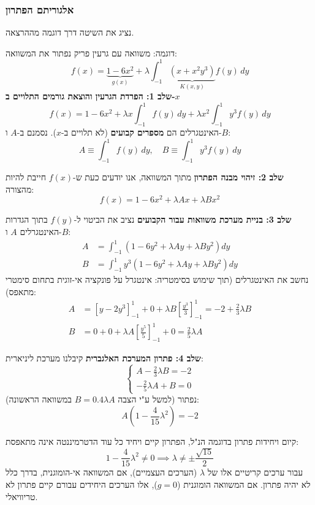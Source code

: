 \subsubsection*{אלגוריתם הפתרון}
נציג את השיטה דרך דוגמה מההרצאה.
\begin{examplebox}{דוגמה: משוואה עם גרעין פריק}
נפתור את המשוואה:
\[
f(x) = \underbrace{1 - 6x^2}_{g(x)} + \lambda \int_{-1}^{1} \underbrace{(x + x^2 y^3)}_{K(x,y)} f(y) \, dy
\]
\textbf{שלב 1: הפרדת הגרעין והוצאת גורמים התלויים ב-$x$}
\[
f(x) = 1 - 6x^2 + \lambda x \int_{-1}^{1} f(y) \, dy + \lambda x^2 \int_{-1}^{1} y^3 f(y) \, dy
\]
האינטגרלים הם \textbf{מספרים קבועים} (לא תלויים ב-$x$). נסמנם ב-$A$ ו-$B$:
\[
A \equiv \int_{-1}^{1} f(y) \, dy, \quad B \equiv \int_{-1}^{1} y^3 f(y) \, dy
\]

\textbf{שלב 2: זיהוי מבנה הפתרון}
מתוך המשוואה, אנו יודעים כעת ש-$f(x)$ חייבת להיות מהצורה:
\[
\boxed{f(x) = 1 - 6x^2 + \lambda A x + \lambda B x^2}
\]

\textbf{שלב 3: בניית מערכת משוואות עבור הקבועים}
נציב את הביטוי ל-$f(y)$ בתוך הגדרות האינטגרלים $A$ ו-$B$:
\begin{align*}
A &= \int_{-1}^{1} \left( 1 - 6y^2 + \lambda A y + \lambda B y^2 \right) dy \\
B &= \int_{-1}^{1} y^3 \left( 1 - 6y^2 + \lambda A y + \lambda B y^2 \right) dy
\end{align*}
נחשב את האינטגרלים (תוך שימוש בסימטריה: אינטגרל על פונקציה אי-זוגית בתחום סימטרי מתאפס):
\begin{align*}
A &= [y - 2y^3]_{-1}^{1} + 0 + \lambda B [\frac{y^3}{3}]_{-1}^{1} = -2 + \frac{2}{3}\lambda B \\
B &= 0 + 0 + \lambda A [\frac{y^5}{5}]_{-1}^{1} + 0 = \frac{2}{5}\lambda A
\end{align*}

\textbf{שלב 4: פתרון המערכת האלגברית}
קיבלנו מערכת ליניארית:
\[
\begin{cases}
A - \frac{2}{3}\lambda B = -2 \\
-\frac{2}{5}\lambda A + B = 0
\end{cases}
\]
נפתור (למשל ע"י הצבה $B = 0.4\lambda A$ במשוואה הראשונה):
\[
A\left(1 - \frac{4}{15}\lambda^2\right) = -2
\]
\end{examplebox}

\begin{theorembox}{קיום ויחידות פתרון}
בדוגמה הנ"ל, הפתרון קיים ויחיד כל עוד הדטרמיננטה אינה מתאפסת:
\[
1 - \frac{4}{15}\lambda^2 \neq 0 \implies \lambda \neq \pm \frac{\sqrt{15}}{2}
\]
עבור ערכים קריטיים אלו של $\lambda$ (הערכים העצמיים), אם המשוואה אי-הומוגנית, בדרך כלל לא יהיה פתרון. אם המשוואה הומוגנית ($g=0$), אלו הערכים היחידים עבורם קיים פתרון לא טריוויאלי.
\end{theorembox}

